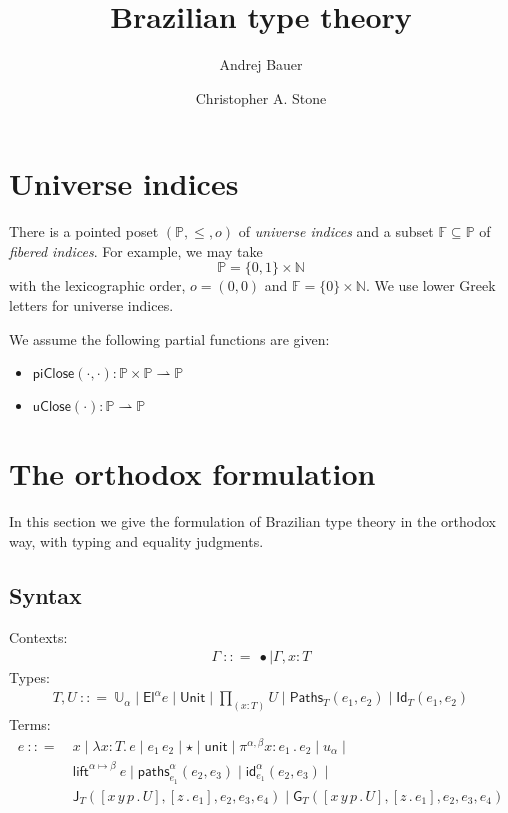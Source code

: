 \documentclass{article}
\newcommand{\NN}{\mathbb{N}} %
\newcommand{\PP}{\mathbb{P}} %
\newcommand{\FF}{\mathbb{F}} %
\newcommand{\zero}{o} %
\newcommand{\piClose}[2]{\mathsf{piClose}(#1,#2)}   %
\newcommand{\uClose}[1]{\mathsf{uClose}(#1)}  %
\newcommand{\G}{\Gamma} %
\newcommand{\T}{T} %
\newcommand{\U}{U} %
\newcommand{\x}{x} %
\newcommand{\e}{e} %
\newcommand{\bnf}{\ \mathrel{{:}{:}{=}}\ }
\newcommand{\bnfor}{\mid}
\newcommand{\ctxempty}{\bullet} %
\newcommand{\ctxextend}[3]{#1, #2 {:} #3} %
\newcommand{\Universe}[1]{\mathbb{U}_{#1}} %
\newcommand{\El}[2]{\mathsf{El}^{#1} #2} %
\newcommand{\Unit}{\mathsf{Unit}} %
\newcommand{\Prod}[2]{{\textstyle\prod_{(#1 {:} #2)}}} %
\newcommand{\lam}[2]{\lambda #1 {:} #2 .\,} %
\newcommand{\app}[2]{#1\,#2} %
\newcommand{\abst}[2]{[#1 \,.\, #2]} %
\newcommand{\unitTerm}{\star} %
\newcommand{\coerce}[3]{\mathsf{lift}^{#2{\mapsto}#3}\ #1}
\newcommand{\PrEqual}[3]{\mathsf{Paths}_{#1}(#2,#3)} %
\newcommand{\JuEqual}[3]{\mathsf{Id}_{#1}(#2,#3)} %
\newcommand{\PrElim}[6]{\mathsf{J}_{#1}(#2, #3, #4, #5, #6)} %
\newcommand{\JuElim}[6]{\mathsf{G}_{#1}(#2, #3, #4, #5, #6)} %
\newcommand{\nUnit}{\mathsf{unit}} %
\newcommand{\nProd}[3]{\pi^{#1} #2 {:} #3 \,.\,} %
\newcommand{\nUniverse}[1]{u_{#1}}  %
\newcommand{\nPrEqual}[4]{\mathsf{paths}^{#1}_{#2}(#3,#4)} %
\newcommand{\nJuEqual}[4]{\mathsf{id}^{#1}_{#2}(#3,#4)} %
\begin{document}
\title{Brazilian type theory}
\author{Andrej Bauer \and Christopher A. Stone}
\maketitle

\section{Universe indices}
\label{sec:universe-indices}

There is a pointed poset $(\PP, {\leq}, \zero)$ of \emph{universe
  indices} and a subset $\FF \subseteq \PP$ of \emph{fibered indices}.
For example, we may take
%
\begin{equation*}
  \PP = \{0,1\} \times \NN
\end{equation*}
%
with the lexicographic order, $\zero = (0,0)$ and $\FF = \{0\} \times
\NN$. We use lower Greek letters for universe indices.

We assume the following partial functions are given:
\begin{itemize}
  \item $\piClose{\cdot}{\cdot} : \PP \times \PP \rightharpoonup \PP$
  \item $\uClose{\cdot}  : \PP \rightharpoonup \PP$
\end{itemize}

\section{The orthodox formulation}
\label{sec:orthodox-formulation}

In this section we give the formulation of Brazilian type theory in the orthodox way, with
typing and equality judgments.

\subsection{Syntax}
\label{sec:syntax}

Contexts:
%
\begin{align*}
  \G \bnf
  \ctxempty \bnfor
  \ctxextend{\G}{\x}{\T}
\end{align*}
%
Types:
%
\begin{align*}
  \T, \U \bnf
  \Universe{\alpha} \bnfor
  \El{\alpha}{\e} \bnfor
  \Unit \bnfor
  \Prod{x}{\T} \U \bnfor
  \PrEqual{T}{\e_1}{\e_2} \bnfor
  \JuEqual{T}{\e_1}{\e_2}
\end{align*}
%
Terms:
%
\begin{align*}
  \e \bnf
  &\x \bnfor
  \lam{\x}{\T} \e \bnfor
  \app{\e_1}{\e_2} \bnfor
  \unitTerm \bnfor
  \nUnit \bnfor
  \nProd{\alpha,\beta}{\x}{\e_1} \e_2 \bnfor
  \nUniverse{\alpha} \bnfor {} \\
  & \coerce{\e}{\alpha}{\beta} \bnfor
  \nPrEqual{\alpha}{\e_1}{\e_2}{\e_3} \bnfor
  \nJuEqual{\alpha}{\e_1}{\e_2}{\e_3} \bnfor {} \\
  & \PrElim{\T}{\abst{x\,y\,p}{\U}}{\abst{z}{\e_1}}{\e_2}{\e_3}{\e_4} \bnfor
    \JuElim{\T}{\abst{x\,y\,p}{\U}}{\abst{z}{\e_1}}{\e_2}{\e_3}{\e_4}
\end{align*}
\end{document}
